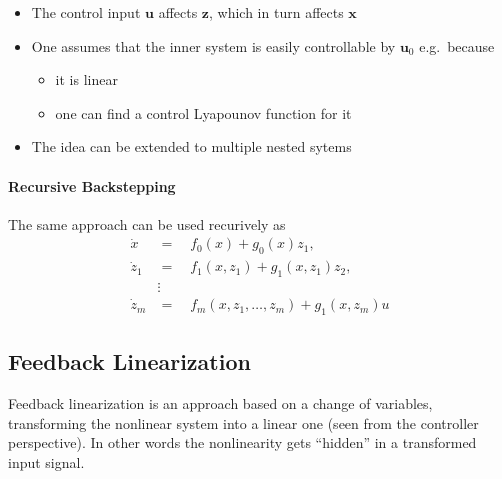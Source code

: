 \newpar{}

\begin{itemize}
    \item The control input $\mathbf{u}$ affects $\mathbf{z}$, which in turn affects $\mathbf{x}$
    \item One assumes that the inner system is easily controllable by $\mathbf{u}_0$ e.g.\ because
          \begin{itemize}
              \item it is linear
              \item one can find a control Lyapounov function for it
          \end{itemize}
    \item The idea can be extended to multiple nested sytems
\end{itemize}

\paragraph{Recursive Backstepping}
The same approach can be used recurively as 
\begin{align*}
    \dot{x}     & =\quad f_{0}(x)+g_{0}(x)z_{1},                     \\
    \dot{z}_{1} & =\quad f_{1}(x,z_{1})+g_{1}(x,z_{1})z_{2},         \\
                & \vdots                                             \\
    \dot{z}_{m} & =\quad f_{m}(x,z_{1},\ldots,z_{m})+g_{1}(x,z_{m})u
\end{align*}

\subsection{Feedback Linearization}
Feedback linearization is an approach based on a change of variables, transforming the nonlinear system into a linear one (seen from the controller perspective). In other words the nonlinearity gets ``hidden'' in a transformed input signal.

